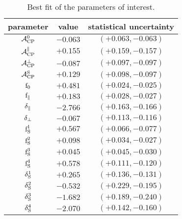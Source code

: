 \begin{table}[!h]
  \center
  \begin{tabular}{c c c}
    \hline
     parameter & value & statistical uncertainty \\
     \hline
     $             \mathcal{A}_{\rm CP}^{0}$ & $-0.063$ & $(+0.063,-0.063)$ \\
     $     \mathcal{A}_{\rm CP}^{\parallel}$ & $+0.155$ & $(+0.159,-0.157)$ \\
     $         \mathcal{A}_{\rm CP}^{\perp}$ & $-0.087$ & $(+0.097,-0.097)$ \\
     $             \mathcal{A}_{\rm CP}^{\rm S}$ & $+0.129$ & $(+0.098,-0.097)$ \\
     \hline
     $              \text{f}_{0}$ & $+0.481$ & $(+0.024,-0.025)$ \\
     $      \text{f}_{\parallel}$ & $+0.183$ & $(+0.028,-0.027)$ \\
     $\delta_{\parallel}$ & $-2.766$ & $(+0.163,-0.166)$ \\
     $    \delta_{\perp}$ & $-0.067$ & $(+0.113,-0.116)$ \\
     \hline
     $              \text{f}_{\text{S}}^{1}$ & $+0.567$ & $(+0.066,-0.077)$ \\
     $              \text{f}_{\text{S}}^{2}$ & $+0.098$ & $(+0.034,-0.027)$ \\
     $              \text{f}_{\text{S}}^{3}$ & $+0.045$ & $(+0.045,-0.030)$ \\
     $              \text{f}_{\text{S}}^{4}$ & $+0.578$ & $(+0.111,-0.120)$ \\
     $          \delta_{\text{S}}^{1}$ & $+0.265$ & $(+0.136,-0.131)$ \\
     $          \delta_{\text{S}}^{2}$ & $-0.532$ & $(+0.229,-0.195)$ \\
     $          \delta_{\text{S}}^{3}$ & $-1.682$ & $(+0.189,-0.240)$ \\
     $          \delta_{\text{S}}^{4}$ & $-2.070$ & $(+0.142,-0.160)$ \\
    \hline
  \end{tabular}
  \caption{\small Best fit of the parameters of interest.}
  \label{bestFitResult}
\end{table}

